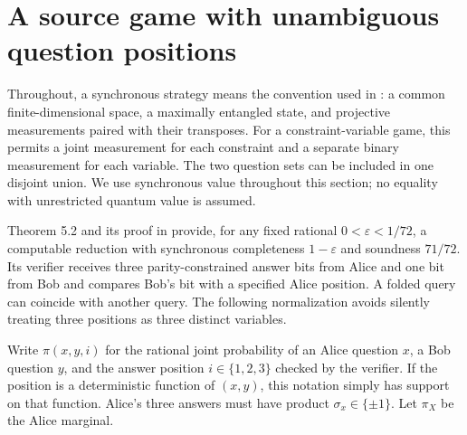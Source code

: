 \documentclass[11pt,a4paper]{article}
\begin{document}
\section{A source game with unambiguous question positions}
Throughout, a synchronous strategy means the convention used in \cite[Sections 2.4 and 5.1]{tv}: a common finite-dimensional space, a maximally entangled state, and projective measurements paired with their transposes. For a constraint-variable game, this permits a joint measurement for each constraint and a separate binary measurement for each variable. The two question sets can be included in one disjoint union. We use synchronous value throughout this section; no equality with unrestricted quantum value is assumed.

Theorem 5.2 and its proof in \cite{tv} provide, for any fixed rational $0<\varepsilon<1/72$, a computable reduction with synchronous completeness $1-\varepsilon$ and soundness $71/72$. Its verifier receives three parity-constrained answer bits from Alice and one bit from Bob and compares Bob's bit with a specified Alice position. A folded query can coincide with another query. The following normalization avoids silently treating three positions as three distinct variables.

Write $\pi(x,y,i)$ for the rational joint probability of an Alice question $x$, a Bob question $y$, and the answer position $i\in\{1,2,3\}$ checked by the verifier. If the position is a deterministic function of $(x,y)$, this notation simply has support on that function. Alice's three answers must have product $\sigma_x\in\{\pm1\}$. Let $\pi_X$ be the Alice marginal.
\end{document}
